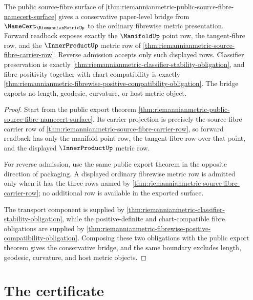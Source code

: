 \begin{theorem}
\label{thm:riemannianmetric-source-fibre-standard-bridge}
The public source-fibre surface of
\autoref{thm:riemannianmetric-public-source-fibre-namecert-surface} gives a
conservative paper-level bridge from
$\NameCert_{\RiemannianMetricUp}$ to the ordinary fibrewise metric
presentation. Forward readback exposes exactly the $\ManifoldUp$ point row,
the tangent-fibre row, and the $\InnerProductUp$ metric row of
\autoref{thm:riemannianmetric-source-fibre-carrier-row}. Reverse admission
accepts only such displayed rows. Classifier preservation is exactly
\autoref{thm:riemannianmetric-classifier-stability-obligation}, and fibre
positivity together with chart compatibility is exactly
\autoref{thm:riemannianmetric-fibrewise-positive-compatibility-obligation}.
The bridge exports no length, geodesic, curvature, or host metric object.
\end{theorem}
\begin{proof}
Start from the public export theorem
\autoref{thm:riemannianmetric-public-source-fibre-namecert-surface}. Its
carrier projection is precisely the source-fibre carrier row of
\autoref{thm:riemannianmetric-source-fibre-carrier-row}, so forward readback
has only the manifold point row, the tangent-fibre row over that point, and
the displayed $\InnerProductUp$ metric row.

For reverse admission, use the same public export theorem in the opposite
direction of packaging. A displayed ordinary fibrewise metric row is admitted
only when it has the three rows named by
\autoref{thm:riemannianmetric-source-fibre-carrier-row}; no additional row is
available in the exported surface.

The transport component is supplied by
\autoref{thm:riemannianmetric-classifier-stability-obligation}, while the
positive-definite and chart-compatible fibre obligations are supplied by
\autoref{thm:riemannianmetric-fibrewise-positive-compatibility-obligation}.
Composing these two obligations with the public export theorem gives the
conservative bridge, and the same boundary excludes length, geodesic,
curvature, and host metric objects.
\end{proof}

\section{The certificate}
\label{sec:riemannianmetric-certificate}

